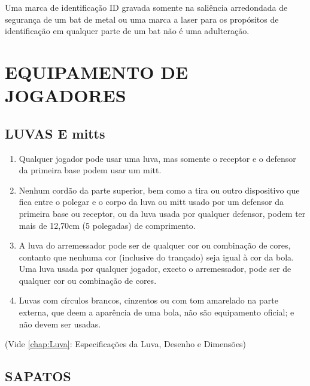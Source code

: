 \begin{enumerate}
		Uma marca de identifica\c{c}\~ao \gls{ID} gravada somente na sali\^encia arredondada de seguran\c{c}a de um \gls{bat} de metal ou uma marca a laser para os prop\'ositos de identifica\c{c}\~ao em qualquer parte de um \gls{bat} n\~ao \'e uma adultera\c{c}\~ao.
	\end{enumerate}




 

	
	\section{EQUIPAMENTO DE JOGADORES}
	\begin{multicols}{2}
	\subsection{LUVAS E \Glspl{mitt}} 
	
	\begin{enumerate}[label=\alph*)]
		\item Qualquer jogador pode usar uma luva, mas somente o receptor e o defensor da primeira base podem usar um \gls{mitt}. 
		
		\item  Nenhum cord\~ao da parte superior, bem como a tira ou outro dispositivo que fica 
		entre o polegar e o corpo da luva ou \gls{mitt} usado por um defensor da primeira base 
		ou receptor, ou da luva usada por qualquer defensor, podem ter mais de 12,70cm (5 
		polegadas) de comprimento. 
		
		\item  A luva do arremessador pode ser de qualquer cor ou combina\c{c}\~ao de cores, contanto 
		que nenhuma cor (inclusive do tran\c{c}ado) seja igual \`a cor da bola. Uma luva usada por 
		qualquer jogador, exceto o arremessador, pode ser de qualquer cor ou combina\c{c}\~ao de 
		cores. 
		
		\item  Luvas com c\'irculos brancos, cinzentos ou com tom amarelado na parte externa, que 
		deem a apar\^encia de uma bola, n\~ao s\~ao equipamento oficial; e n\~ao devem ser usadas. 
	\end{enumerate}
	(Vide \autoref{chap:Luva}: Especifica\c{c}\~oes da Luva, Desenho e Dimens\~oes) 
	
	\subsection{SAPATOS} \label{sec:Sapatos}
	

\end{multicols}
